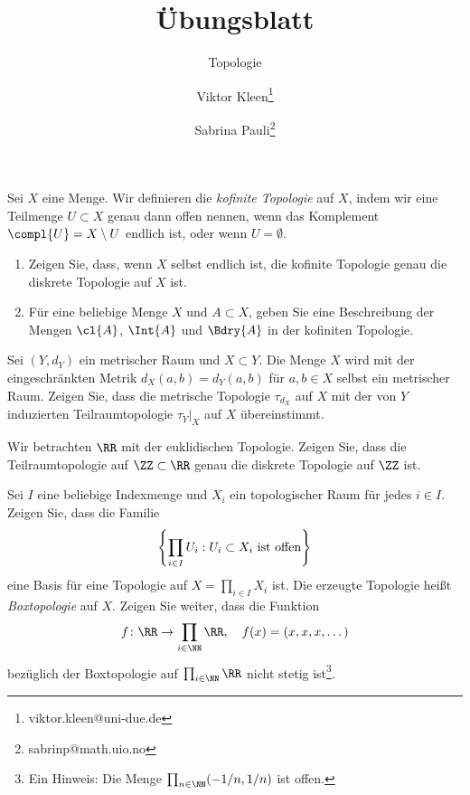 

\setcounter{Sheet}{2}

\title{Übungsblatt \theSheet}
\subtitle{Topologie}
\author{Viktor Kleen\footnote{viktor.kleen@uni-due.de} \and Sabrina Pauli\footnote{sabrinp@math.uio.no}}
\date{}


\maketitle
\begin{exercise}
Sei $X$ eine Menge. Wir definieren die \emph{kofinite Topologie} auf $X$,
indem wir eine Teilmenge $U\subset X$ genau dann offen nennen, wenn das
Komplement $\compl{U} = X\setminus U$ endlich ist, oder wenn $U = \emptyset$.
\begin{enumerate}
\item Zeigen Sie, dass, wenn $X$ selbst endlich ist, die kofinite
    Topologie genau die diskrete Topologie auf $X$ ist.
\item Für eine beliebige Menge $X$ und $A\subset X$, geben Sie eine
    Beschreibung der Mengen $\cl{A}$, $\Int{A}$ und $\Bdry{A}$ in der kofiniten
    Topologie.
\end{enumerate}
\end{exercise}

\begin{exercise}
Sei $(Y,d_Y)$ ein metrischer Raum und $X\subset Y$. Die Menge $X$ wird mit
der eingeschränkten Metrik $d_X(a,b) = d_Y(a,b)$ für $a,b\in X$ selbst
ein metrischer Raum. Zeigen Sie, dass die metrische Topologie $\tau_{d_X}$
auf $X$ mit der von $Y$ induzierten Teilraumtopologie $\tau_Y|_X$ auf $X$
übereinstimmt.
\end{exercise}

\begin{exercise}
Wir betrachten $\RR$ mit der euklidischen Topologie. Zeigen Sie, dass die
Teilraumtopologie auf $\ZZ\subset\RR$ genau die diskrete Topologie auf
$\ZZ$ ist.
\end{exercise}

\begin{exercise}
Sei $I$ eine beliebige Indexmenge und $X_i$ ein topologischer Raum für
jedes $i\in I$. Zeigen Sie, dass die Familie
\[
\left\{ \prod_{i\in I} U_i : \textnormal{$U_i\subset X_i$ ist offen} \right\}
\]
eine Basis für eine Topologie auf $X = \prod_{i\in I} X_i$ ist. Die erzeugte
Topologie heißt \emph{Boxtopologie} auf $X$. Zeigen Sie weiter, dass die
Funktion
\[
f\colon \RR \to \prod_{i\in\NN} \RR,\quad f(x) = (x,x,x,\dots)
\]
bezüglich der Boxtopologie auf $\prod_{i\in\NN}\RR$ nicht stetig
ist\footnote{Ein Hinweis: Die Menge $\prod_{n\in\NN} (-1/n, 1/n)$ ist offen.}.
\end{exercise}


